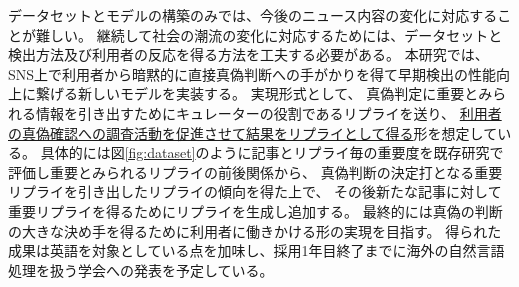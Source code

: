 \vspace{20pt}
データセットとモデルの構築のみでは、今後のニュース内容の変化に対応することが難しい。
継続して社会の潮流の変化に対応するためには、データセットと検出方法及び利用者の反応を得る方法を工夫する必要がある。
本研究では、SNS上で利用者から暗黙的に直接真偽判断への手がかりを得て早期検出の性能向上に繋げる新しいモデルを実装する。
実現形式として、
真偽判定に重要とみられる情報を引き出すためにキュレーターの役割であるリプライを送り、
\underline{利用者の真偽確認への調査活動を促進させて結果をリプライとして得る}形を想定している。
具体的には図\ref{fig:dataset}のように記事とリプライ毎の重要度を既存研究\cite{shu2019kdd}で評価し重要とみられるリプライの前後関係から、
真偽判断の決定打となる重要リプライを引き出したリプライの傾向を得た上で、
その後新たな記事に対して重要リプライを得るためにリプライを生成し追加する。
最終的には真偽の判断の大きな決め手を得るために利用者に働きかける形の実現を目指す。
得られた成果は英語を対象としている点を加味し、採用1年目終了までに海外の自然言語処理を扱う学会への発表を予定している。

